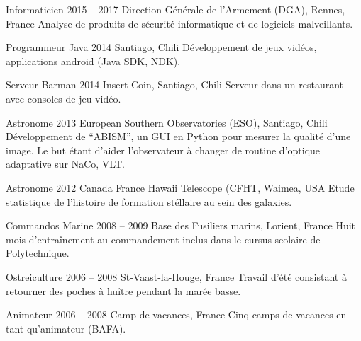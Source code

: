 \begin{joblist}
\item[Informaticien]{2015 -- 2017}
	{Direction Générale de l'Armement (DGA), Rennes, France}
	{Analyse de produits de sécurité informatique et de logiciels malveillants.}

\item[Programmeur Java]{2014}
	{Santiago, Chili}
	{Développement de jeux vidéos, applications android (Java SDK, NDK).}


\item[Serveur-Barman]{2014}
	{Insert-Coin, Santiago, Chili}
	{Serveur dans un restaurant avec consoles de jeu vidéo.}


\item[Astronome]{2013}
	{European Southern Observatories (ESO), Santiago, Chili}
	{Développement de ``ABISM'', un GUI en Python pour mesurer la qualité d'une image.
 	Le but étant d'aider l'observateur à changer de routine d'optique adaptative sur NaCo, VLT.}


\item[Astronome]{2012}
	{Canada France Hawaii Telescope (CFHT, Waimea, USA}
	{Etude statistique de l'histoire de formation stéllaire au sein des galaxies.}


\item[Commandos Marine]{2008 -- 2009}
	{Base des Fusiliers marins, Lorient, France}
	{Huit mois d'entraînement au commandement inclus dans le cursus scolaire de Polytechnique.}


\item[Ostreiculture]{2006 -- 2008}
	{St-Vaast-la-Houge, France}
	{Travail d'été consistant à retourner des poches à huître pendant la marée basse.}


\item[Animateur]{2006 -- 2008}
	{Camp de vacances, France}
	{Cinq camps de vacances en tant qu'animateur (BAFA).}

\end{joblist}



\begin{skilllist}






\end{skilllist}


